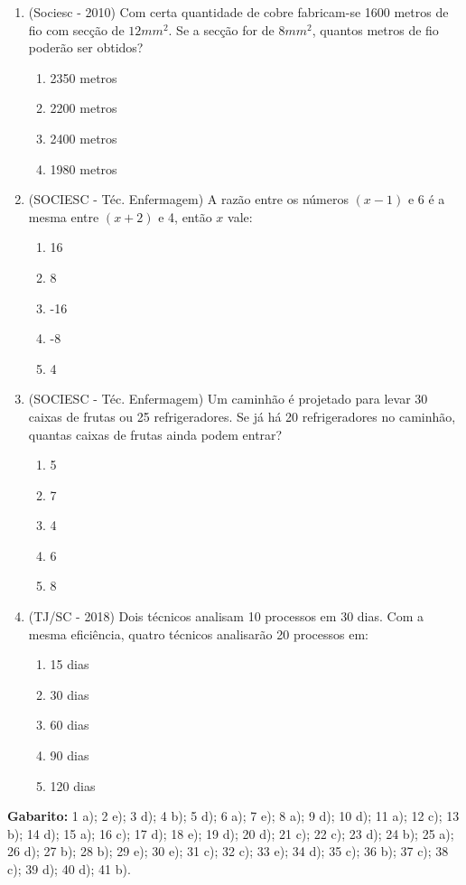 \begin{enumerate}
 \item (Sociesc - 2010) Com certa quantidade de cobre fabricam-se 1600 metros de fio com secção de $12 mm^2$. Se a secção for de $8mm^2$, quantos metros de fio poderão ser obtidos?
  \begin{enumerate}
  \item 2350 metros
  \item 2200 metros
  \item 2400 metros
  \item 1980 metros
 \end{enumerate}

 \item (SOCIESC - Téc. Enfermagem) A razão entre os números $(x-1)$ e 6 é a mesma entre $(x+2)$ e 4, então $x$ vale:
  \begin{enumerate}
  \item 16
  \item 8
  \item -16
  \item -8
  \item 4
 \end{enumerate}

 \item (SOCIESC - Téc. Enfermagem) Um caminhão é projetado para levar 30 caixas de frutas ou 25 refrigeradores. Se já há 20 refrigeradores no caminhão, quantas caixas de frutas ainda podem entrar?
 \begin{enumerate}
  \item 5
  \item 7
  \item 4
  \item 6
  \item 8
 \end{enumerate}

 \item (TJ/SC - 2018) Dois técnicos analisam 10 processos em 30 dias. Com a mesma eficiência, quatro técnicos analisarão 20 processos em:
    \begin{enumerate}
    \item 15 dias
    \item 30 dias
    \item 60 dias
    \item 90 dias
    \item 120 dias
    \end{enumerate}

\end{enumerate}

 \textbf{Gabarito:} 1 a); 2 e); 3 d); 4 b); 5 d); 6 a); 7 e); 8 a); 9 d); 10 d); 11 a); 12 c); 13 b); 14 d); 15 a); 16 c); 17 d); 18 e); 19 d); 20 d); 21 c); 22 c); 23 d); 24 b); 25 a); 26 d); 27 b); 28 b); 29 e); 30 e); 31 c); 32 c); 33 e); 34 d); 35 c); 36 b); 37 c); 38 c); 39 d); 40 d); 41 b).
